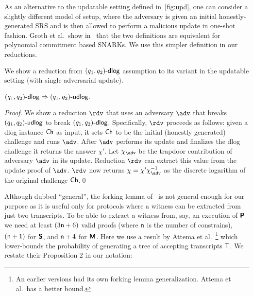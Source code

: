 \begin{remark}\label{rem:upd}
	As an alternative to the updatable setting defined in~\cref{fig:upd}, one can consider a slightly different model of setup, where the adversary is given an initial honestly-generated SRS and is then allowed to perform a malicious update in one-shot fashion.
	Groth
	et al.\ show in~\cite{C:GKMMM18} that the two definitions are equivalent for polynomial commitment based SNARKs. We use this simpler definition in our reductions.
\end{remark}


We show a reduction from $(q_1, q_2)\text{-}\mathsf{dlog}$ assumption to its variant in the updatable setting (with single adversarial update). 
\begin{lemma}
	$(q_1, q_2)\text{-}\mathsf{dlog} \Rightarrow (q_1, q_2)\text{-}\mathsf{udlog}$.
	\end{lemma}
\begin{proof}
	We show a reduction $\reduction$ that uses an adversary $\adv$ that breaks $(q_1, q_2)\text{-}\mathsf{udlog}$ to break $(q_1, q_2)\text{-}\mathsf{dlog}$. Specifically, $\reduction$ proceeds as follows: given a dlog instance $\mathsf{Ch}$ as input, it sets $\mathsf{Ch}$ to be the initial (honestly generated) challenge and runs $\adv$. After $\adv$ performs its update and finalizes the dlog challenge it returns the answer $\chi'$. Let $\chi_\adv$ be the trapdoor contribution of adversary $\adv$ in its update. Reduction $\reduction$ can extract this value from the update proof of $\adv$. $\reduction$ now returns $\chi = \chi' \chi_\adv^{-1}$ as the discrete logarithm of the original challenge $\mathsf{Ch}$.\qed
	\end{proof}


Although dubbed ``general'', the forking lemma of~\cite{CCS:BelNev06} is not general enough for our purpose as it is useful only for protocols where a witness can be extracted from just two transcripts. To be able to extract a witness from, say, an execution of $\bm{\mathsf{P}}$ we need at least $(3 \mathsf{n} + 6)$ valid proofs (where $\mathsf{n}$ is the number of constrains), $(\mathsf{n} + 1)$ for $\bm{\mathsf{S}}$, and $\mathsf{n} + 4$ for $\bm{\mathsf{M}}$.
 Here we use a result by Attema et
al.~\cite{EPRINT:AttFehKlo21short}\footnote{An earlier versions had its own forking lemma generalization. Attema et al.\ has a better bound.}  which lower-bounds the probability of generating a tree of accepting transcripts $\mathsf{T}$. We restate their Proposition 2 in our notation:

